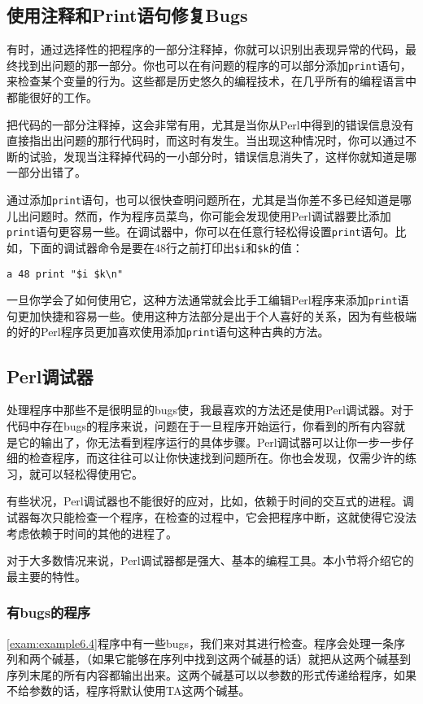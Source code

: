 \subsection{使用注释和Print语句修复Bugs}
有时，通过选择性的把程序的一部分注释掉，你就可以识别出表现异常的代码，最终找到出问题的那一部分。你也可以在有问题的程序的可以部分添加\verb|print|语句，来检查某个变量的行为。这些都是历史悠久的编程技术，在几乎所有的编程语言中都能很好的工作。

把代码的一部分注释掉，这会非常有用，尤其是当你从Perl中得到的错误信息没有直接指出出问题的那行代码时，而这时有发生。当出现这种情况时，你可以通过不断的试验，发现当注释掉代码的一小部分时，错误信息消失了，这样你就知道是哪一部分出错了。

通过添加\verb|print|语句，也可以很快查明问题所在，尤其是当你差不多已经知道是哪儿出问题时。然而，作为程序员菜鸟，你可能会发现使用Perl调试器要比添加\verb|print|语句更容易一些。在调试器中，你可以在任意行轻松得设置\verb|print|语句。比如，下面的调试器命令是要在48行之前打印出\verb|$i|和\verb|$k|的值：

\begin{lstlisting}
a 48 print "$i $k\n"
\end{lstlisting}

一旦你学会了如何使用它，这种方法通常就会比手工编辑Perl程序来添加\verb|print|语句更加快捷和容易一些。使用这种方法部分是出于个人喜好的关系，因为有些极端的好的Perl程序员更加喜欢使用添加\verb|print|语句这种古典的方法。

\subsection{Perl调试器}
处理程序中那些不是很明显的bugs使，我最喜欢的方法还是使用Perl调试器。对于代码中存在bugs的程序来说，问题在于一旦程序开始运行，你看到的所有内容就是它的输出了，你无法看到程序运行的具体步骤。Perl调试器可以让你一步一步仔细的检查程序，而这往往可以让你快速找到问题所在。你也会发现，仅需少许的练习，就可以轻松得使用它。

有些状况，Perl调试器也不能很好的应对，比如，依赖于时间的交互式的进程。调试器每次只能检查一个程序，在检查的过程中，它会把程序中断，这就使得它没法考虑依赖于时间的其他的进程了。

对于大多数情况来说，Perl调试器都是强大、基本的编程工具。本小节将介绍它的最主要的特性。

\subsubsection{有bugs的程序}
\autoref{exam:example6.4}程序中有一些bugs，我们来对其进行检查。程序会处理一条序列和两个碱基，（如果它能够在序列中找到这两个碱基的话）就把从这两个碱基到序列末尾的所有内容都输出出来。这两个碱基可以以参数的形式传递给程序，如果不给参数的话，程序将默认使用TA这两个碱基。

